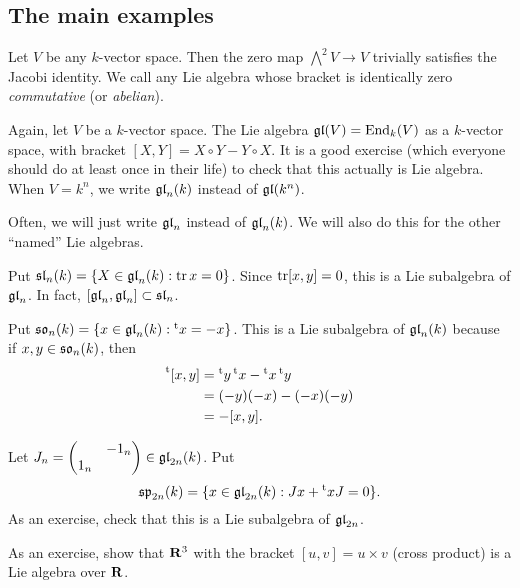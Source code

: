 \subsection{The main examples}

\begin{example}
Let $V$ be any $k$-vector space. Then the zero map $\bigwedge^2 V\to V$ 
trivially satisfies the Jacobi identity. We call any Lie algebra whose 
bracket is identically zero \emph{commutative} (or \emph{abelian}). 
\end{example}

\begin{example}
Again, let $V$ be a $k$-vector space. The Lie algebra $\mathfrak{gl}(V)=\operatorname{End}_k(V)$ as a 
$k$-vector space, with bracket $[X,Y]=X\circ Y-Y\circ X$. It is a good exercise 
(which everyone should do at least once in their life) to check that this 
actually is Lie algebra. When $V=k^n$, we write $\mathfrak{gl}_n(k)$ instead of 
$\mathfrak{gl}(k^n)$. 
\end{example}

Often, we will just write $\mathfrak{gl}_n$ instead of $\mathfrak{gl}_n(k)$. We will also do this 
for the other ``named'' Lie algebras. 

\begin{example}
Put $\mathfrak{sl}_n(k)=\{X\in \mathfrak{gl}_n(k):\operatorname{tr} x=0\}$. Since $\operatorname{tr} [x,y]=0$, this is a 
Lie subalgebra of $\mathfrak{gl}_n$. In fact, $[\mathfrak{gl}_n,\mathfrak{gl}_n]\subset \mathfrak{sl}_n$. 
\end{example}

\begin{example}
Put $\mathfrak{so}_n(k) = \{x\in \mathfrak{gl}_n(k):\prescript{\mathrm{t}}{}{x}=-x\}$. This is a Lie subalgebra 
of $\mathfrak{gl}_n(k)$ because if $x,y\in \mathfrak{so}_n(k)$, then 
\begin{align*}
  \prescript{\mathrm{t}}{}{[x,y]} 
    &= \prescript{\mathrm{t}}{}{y} \prescript{\mathrm{t}}{}{x}-\prescript{\mathrm{t}}{}{x} \prescript{\mathrm{t}}{}{y} \\
    &= (-y)(-x) - (-x)(-y) \\
    &= -[x,y] .
\end{align*}
\end{example}

\begin{example}[Symplectic]
Let $J_n=\begin{pmatrix}  & -1_n \\ 1_n &  \end{pmatrix}\in \mathfrak{gl}_{2n}(k)$. Put 
\[
  \mathfrak{sp}_{2n}(k) = \{x\in \mathfrak{gl}_{2n}(k):J x+\prescript{\mathrm{t}}{}{x} J=0\} .
\]
As an exercise, check that this is a Lie subalgebra of $\mathfrak{gl}_{2n}$. 
\end{example}

As an exercise, show that $\mathbf{R}^3$ with the bracket $[u,v]=u\times v$ (cross 
product) is a Lie algebra over $\mathbf{R}$. 

